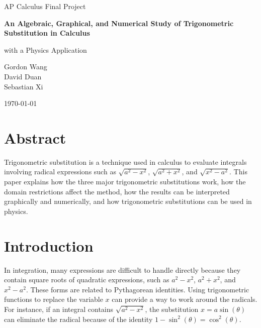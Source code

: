 \documentclass[12pt]{article}
\begin{document}
\begin{titlepage}
\centering
\vspace*{1.2in}

{\Large AP Calculus Final Project\par}

\vspace{0.9in}

{\huge\bfseries An Algebraic, Graphical, and Numerical Study of Trigonometric Substitution in Calculus\par}

\vspace{0.25in}

{\Large with a Physics Application
\par}

\vspace{1.1in}

{\large
Gordon Wang\\
David Duan\\
Sebastian Xi
\par}

\vfill

{\large \today\par}

\end{titlepage}

\section*{Abstract}
Trigonometric substitution is a technique used in calculus to evaluate integrals involving radical expressions such as \(\sqrt{a^2 - x^2}\), \(\sqrt{a^2 + x^2}\), and \(\sqrt{x^2 - a^2}\). This paper explains how the three major trigonometric substitutions work, how the domain restrictions affect the method, how the results can be interpreted graphically and numerically, and how trigonometric substitutions can be used in physics.

\section{Introduction}

In integration, many expressions are difficult to handle directly because they contain square roots of quadratic expressions, such as \(a^2 - x^2\), \(a^2 + x^2\), and \(x^2 - a^2\). These forms are related to Pythagorean identities. Using trigonometric functions to replace the variable \(x\) can provide a way to work around the radicals. For instance, if an integral contains \(\sqrt{a^2 - x^2}\), the substitution \(x = a\sin(\theta)\) can eliminate the radical because of the identity \(1 - \sin^2(\theta) = \cos^2(\theta)\).
\end{document}
